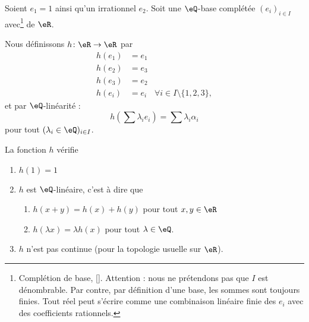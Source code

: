 \begin{proposition}
    Soient \( e_1=1\) ainsi qu'un irrationnel \( e_2\). Soit une \( \eQ\)-base complétée \( (e_i)_{i\in I}\) avec\footnote{Complétion de base, \ref{}. Attention : nous ne prétendons pas que \( I\) est dénombrable. Par contre, par définition d'une base, les sommes sont toujours finies. Tout réel peut s'écrire comme une combinaison linéaire finie des \( e_i\) avec des coefficients rationnels.} de \( \eR\).

    Nous définissons \( h\colon \eR\to \eR\) par
    \begin{subequations}
        \begin{align}
            h(e_1)&=e_1\\
            h(e_2)&=e_3\\
            h(e_3)&=e_2\\
            h(e_i)&=e_i &  \forall i\in I\setminus\{ 1,2,3 \},
        \end{align}
    \end{subequations}
    et par \( \eQ\)-linéarité :
    \begin{equation}
        	h(\sum \lambda_i e_i) = \sum \lambda_i \alpha_i
    \end{equation}
    pour tout \( (\lambda_i\in \eQ)_{i\in I}\).

    La fonction \( h\) vérifie
    \begin{enumerate}
        \item       \label{ITEMooOXXMooJFSuuN}
            \( h(1)=1\)
        \item
            \( h\) est \( \eQ\)-linéaire, c'est à dire que
            \begin{enumerate}
                \item   \label{ITEMooAVNMooEsodLR}
            \( h(x+y)=h(x)+h(y)\) pour tout \( x,y\in \eR\)
        \item       \label{ITEMooDEJMooXtvrgi}
            \( h(\lambda x)=\lambda h(x)\) pour tout \( \lambda\in \eQ\).
            \end{enumerate}
        \item       \label{ITEMooMHNZooBHQywD}
            \( h\) n'est pas continue (pour la topologie usuelle sur \( \eR\)).
    \end{enumerate}
\end{proposition}

